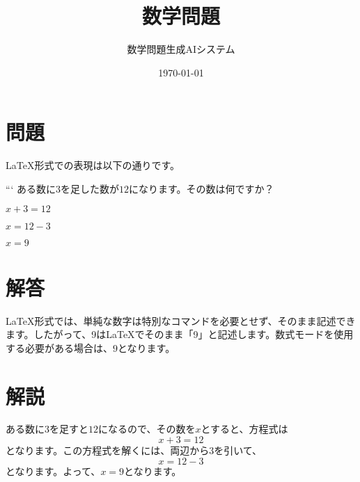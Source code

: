 \documentclass[a4paper,11pt]{article}
\title{数学問題}
\author{数学問題生成AIシステム}
\date{\today}
\numberwithin{equation}{section}
\theoremstyle{definition}
\theoremstyle{remark}
\begin{document}
\maketitle

\section*{問題}

LaTeX形式での表現は以下の通りです。

```
ある数に$3$を足した数が$12$になります。その数は何ですか？

$x + 3 = 12$

$x = 12 - 3$

$x = 9$



\section*{解答}

LaTeX形式では、単純な数字は特別なコマンドを必要とせず、そのまま記述できます。したがって、9はLaTeXでそのまま「9」と記述します。数式モードを使用する必要がある場合は、$9$となります。

\section*{解説}

ある数に$3$を足すと$12$になるので、その数を$x$とすると、方程式は
\[x + 3 = 12\]
となります。この方程式を解くには、両辺から$3$を引いて、
\[x = 12 - 3\]
となります。よって、$x = 9$となります。
\end{document}
